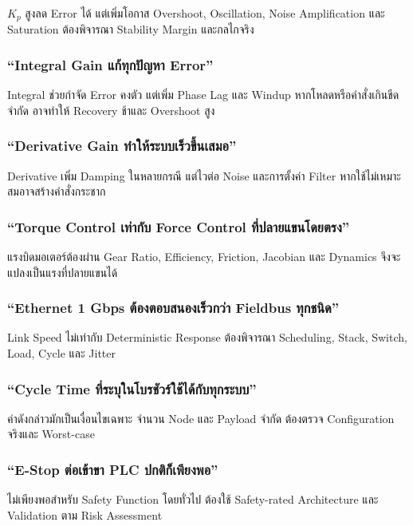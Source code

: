 $K_p$ สูงลด Error ได้ แต่เพิ่มโอกาส Overshoot, Oscillation, Noise Amplification และ Saturation ต้องพิจารณา Stability Margin และกลไกจริง

\subsubsection{“Integral Gain แก้ทุกปัญหา Error”}

Integral ช่วยกำจัด Error คงตัว แต่เพิ่ม Phase Lag และ Windup หากโหลดหรือคำสั่งเกินขีดจำกัด อาจทำให้ Recovery ช้าและ Overshoot สูง

\subsubsection{“Derivative Gain ทำให้ระบบเร็วขึ้นเสมอ”}

Derivative เพิ่ม Damping ในหลายกรณี แต่ไวต่อ Noise และการตั้งค่า Filter หากใช้ไม่เหมาะสมอาจสร้างคำสั่งกระชาก

\subsubsection{“Torque Control เท่ากับ Force Control ที่ปลายแขนโดยตรง”}

แรงบิดมอเตอร์ต้องผ่าน Gear Ratio, Efficiency, Friction, Jacobian และ Dynamics จึงจะแปลงเป็นแรงที่ปลายแขนได้

\subsubsection{“Ethernet 1 Gbps ต้องตอบสนองเร็วกว่า Fieldbus ทุกชนิด”}

Link Speed ไม่เท่ากับ Deterministic Response ต้องพิจารณา Scheduling, Stack, Switch, Load, Cycle และ Jitter

\subsubsection{“Cycle Time ที่ระบุในโบรชัวร์ใช้ได้กับทุกระบบ”}

ค่าดังกล่าวมักเป็นเงื่อนไขเฉพาะ จำนวน Node และ Payload จำกัด ต้องตรวจ Configuration จริงและ Worst-case

\subsubsection{“E-Stop ต่อเข้าขา PLC ปกติก็เพียงพอ”}

ไม่เพียงพอสำหรับ Safety Function โดยทั่วไป ต้องใช้ Safety-rated Architecture และ Validation ตาม Risk Assessment

